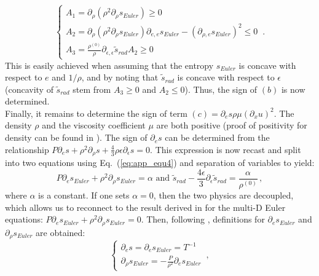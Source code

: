 \documentclass[review]{elsarticle}
\newcommand{\eqt}[1]{Eq.~(\ref{#1})}                     %
\begin{document}
\begin{appendices}
 \begin{equation}
 \label{eq:A_matrix}
 \left\{
 \begin{array}{lll}
 A_1 = \partial_{\rho} \left( \rho^2 \partial_{\rho} s_{Euler} \right) \geq 0 \\
 A_2 = \partial_{\rho} \left( \rho^2 \partial_{\rho} s_{Euler} \right) \partial_{e,e} s_{Euler} - \left( \partial_{\rho,e} s_{Euler} \right)^2 \leq 0\\
 A_3 =  \frac{\rho^{(0)}}{\rho} \partial_{\epsilon,\epsilon} \tilde{s}_{rad} A_2 \geq 0
 \end{array}
 \right.  \,.
 \end{equation} 
This is easily achieved when assuming that the entropy $s_{Euler}$ is concave with respect to $e$ and $1/ \rho$, and by noting that $\tilde{s}_{rad}$ is concave with respect to $\epsilon$ (concavity of $\tilde{s}_{rad}$ stem from $A_3 \geq 0$ and $A_2 \leq 0$).
Thus, the sign of $(b)$ is now determined. \\
%
Finally, it remains to determine the sign of term $(c) = \partial_e s \rho \mu (\partial_x u)^2$. The density $\rho$ and the viscosity coefficient $\mu$ are both positive (proof of positivity for density can be found in \cite{jlg}). The sign of $\partial_e s$ can be determined from the relationship $P \partial_e s + \rho^2 \partial_{\rho} s + \frac{4}{3} \rho \epsilon \partial_{\epsilon} s=0$.  This expression is now recast and split into two equations using \eqt{eq:app_equ4} and separation of variables to yield:
 \begin{equation}
 P \partial_e s_{Euler} + \rho^2 \partial_{\rho} s_{Euler} = \alpha \text{  and  } \tilde{s}_{rad} - \frac{4\epsilon}{3} \partial_{\epsilon} \tilde{s}_{rad} = \frac{\alpha}{\rho^{(0)}}  \,,
 \end{equation}
 where $\alpha$ is a constant. If one sets $\alpha=0$, then the two physics are decoupled, which allows us to reconnect to the result derived in \cite{jlg} for the multi-D Euler equations: $P \partial_e s_{Euler} + \rho^2 \partial_{\rho} s_{Euler} = 0$. Then, following \cite{jlg}, definitions for $\partial_e s_{Euler}$ and $\partial_{\rho} s_{Euler}$ are obtained:
 \begin{equation}
 \label{eq:definition}
 \left\{
 \begin{array}{ll}
 \partial_e s = \partial_e s_{Euler} = T^{-1} \nonumber\\
 \partial_{\rho} s_{Euler} = -\frac{P}{\rho^2} \partial_e s_{Euler}
 \end{array}
 \right.  \,,
 \end{equation} 

\end{appendices}
\end{document}

